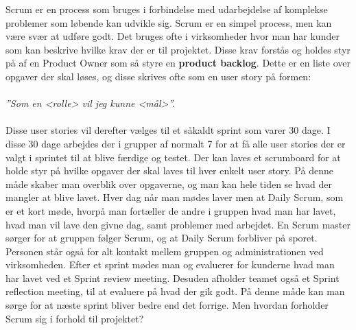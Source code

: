 Scrum er en process som bruges i forbindelse med udarbejdelse af komplekse problemer som løbende kan udvikle sig. 
Scrum er en simpel process, men kan være svær at udføre godt.
Det bruges ofte i virksomheder hvor man har kunder som kan beskrive hvilke krav der er til projektet.
Disse krav forstås og holdes styr på af en Product Owner som så styre en \textbf{product backlog}.
Dette er en liste over opgaver der skal løses, og disse skrives ofte som en user story på formen:\\ \\ \textit{''Som en <rolle> vil jeg kunne <mål>''. }\\ \\
Disse user stories vil derefter vælges til et såkaldt sprint som varer 30 dage. 
I disse 30 dage arbejdes der i grupper af normalt 7 for at få alle user stories der er valgt i sprintet til at blive færdige og testet.
Der kan laves et scrumboard for at holde styr på hvilke opgaver der skal laves til hver enkelt user story. 
På denne måde skaber man overblik over opgaverne, og man kan hele tiden se hvad der mangler at blive lavet.
Hver dag når man mødes laver men at Daily Scrum, som er et kort møde, hvorpå man fortæller de andre i gruppen hvad man har lavet, hvad man vil lave den givne dag, samt problemer med arbejdet.
En Scrum master sørger for at gruppen følger Scrum, og at Daily Scrum forbliver på sporet. 
Personen står også for alt kontakt mellem gruppen og administrationen ved virksomheden.
Efter et sprint mødes man og evaluerer for kunderne hvad man har lavet ved et Sprint review meeting.
Desuden afholder teamet også et Sprint reflection meeting, til at evaluere på hvad der gik godt.
På denne måde kan man sørge for at næste sprint bliver bedre end det forrige. 
Men hvordan forholder Scrum sig i forhold til projektet?

